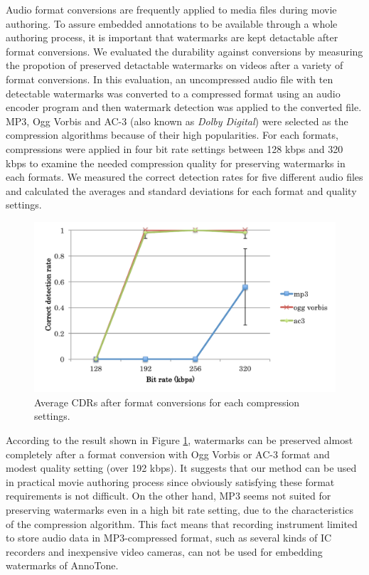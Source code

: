 Audio format conversions are frequently applied to media files during movie authoring.
To assure embedded annotations to be available through a whole authoring process, it is important that watermarks are kept detactable after format conversions.
We evaluated the durability against conversions by measuring the propotion of preserved detactable watermarks on videos after a variety of format conversions.
In this evaluation, an uncompressed audio file with ten detectable watermarks was converted to a compressed format using an audio encoder program and then watermark detection was applied to the converted file.
MP3, Ogg Vorbis and AC-3 (also known as {\it Dolby Digital}) were selected as the compression algorithms because of their high popularities.
For each formats, compressions were applied in four bit rate settings between 128 kbps and 320 kbps to examine the needed compression quality for preserving watermarks in each formats.
We measured the correct detection rates for five different audio files and calculated the averages and standard deviations for each format and quality settings.

\begin{figure}[htbp]
 \begin{center}
  \includegraphics[width=120mm]{evaluation_conversion.pdf}
 \end{center}
 \caption{Average CDRs after format conversions for each compression settings.}
 \label{fig:eval_conv}
\end{figure}

According to the result shown in Figure \ref{fig:eval_conv}, watermarks can be preserved almost completely after a format conversion with Ogg Vorbis or AC-3 format and modest quality setting (over 192 kbps).
It suggests that our method can be used in practical movie authoring process since obviously satisfying these format requirements is not difficult.
On the other hand, MP3 seems not suited for preserving watermarks even in a high bit rate setting, due to the characteristics of the compression algorithm.
This fact means that recording instrument limited to store audio data in MP3-compressed format, such as several kinds of IC recorders and inexpensive video cameras, can not be used for embedding watermarks of AnnoTone.
